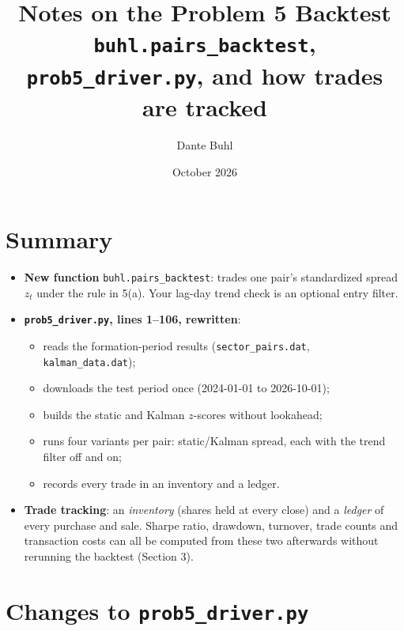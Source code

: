 \documentclass[11pt]{article}
\title{Notes on the Problem 5 Backtest\\
\large \texttt{buhl.pairs\_backtest}, \texttt{prob5\_driver.py}, and how trades are tracked}
\author{Dante Buhl}
\date{October 2026}
\begin{document}
\maketitle

\section*{Summary}

\begin{itemize}
    \item \textbf{New function} \texttt{buhl.pairs\_backtest}: trades one pair's
    standardized spread $z_t$ under the rule in 5(a). Your lag-day trend
    check is an optional entry filter.
    \item \textbf{\texttt{prob5\_driver.py}, lines 1--106, rewritten}:
    \begin{itemize}
        \item reads the formation-period results (\texttt{sector\_pairs.dat},
        \texttt{kalman\_data.dat});
        \item downloads the test period once (2024-01-01 to 2026-10-01);
        \item builds the static and Kalman $z$-scores without lookahead;
        \item runs four variants per pair: static/Kalman spread, each with
        the trend filter off and on;
        \item records every trade in an inventory and a ledger.
    \end{itemize}
    \item \textbf{Trade tracking}: an \emph{inventory} (shares held at every
    close) and a \emph{ledger} of every purchase and sale. Sharpe ratio,
    drawdown, turnover, trade counts and transaction costs can all be computed
    from these two afterwards without rerunning the backtest (Section 3).
\end{itemize}

\section{Changes to \texttt{prob5\_driver.py}}
\end{document}

